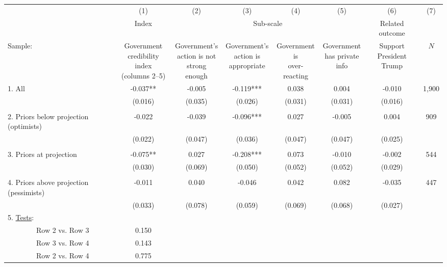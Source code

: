 \begin{tabular}{l c c c c c c c} 
  \hline
  \hline
  & (1) & (2) & (3) & (4) & (5) & (6) & (7) \\
  & Index & \multicolumn{4}{c}{Sub-scale} &
                                                             Related outcome \\
  \cmidrule(l){2-2} \cmidrule(l){3-6} \cmidrule(l){7-7} 
Sample: & \shortstack{Government \\ credibility index \\
  (columns 2--5) } &
                                                     \shortstack{Government's                     
                                                                    \\
  action
  is not \\ strong enough } &
                                                                \shortstack{Government's
  \\ action is 
  \\ appropriate}  & \shortstack{Government \\ is \\ over-reacting} &
                                                         \shortstack{Government \\
                                                         has private \\
  info} & \shortstack{Support \\ President \\ Trump} & $N$ \\  
  \hline 
1. All  & -0.037** & -0.005 & -0.119*** & 0.038 & 0.004
             & -0.010 & 1,900 \\ 
& (0.016) & (0.035) & (0.026) & (0.031) & (0.031)
                               & (0.016) \\
\\
2. Priors below projection (optimists) & -0.022 & -0.039 & -0.096*** & 0.027 & -0.005
             & 0.004 & 909\\ 
  & (0.022) & (0.047) & (0.036) & (0.047) & (0.047)
             & (0.025) \\
\\
3. Priors at projection & -0.075** & 0.027 & -0.208*** & 0.073 & -0.010
             & -0.002 & 544\\ 
  & (0.030) & (0.069) & (0.050) & (0.052) & (0.052)
             & (0.029) \\
\\
4. Priors above projection (pessimists) & -0.011 & 0.040 & -0.046 & 0.042 & 0.082
             & -0.035 & 447 \\
 & (0.033) & (0.078) & (0.059) & (0.069) & (0.068)
                                & (0.027) \\
  \hline
  5. \ul{Tests}: \\
  \ \ \ \ \ \ \ \   Row 2 vs. Row 3 & 0.150 \\
  \ \ \ \ \ \ \ \   Row 3 vs. Row 4 & 0.143 \\
  \ \ \ \ \ \ \ \  Row 2 vs. Row 4 & 0.775 \\
  \hline
  \hline 
\end{tabular}